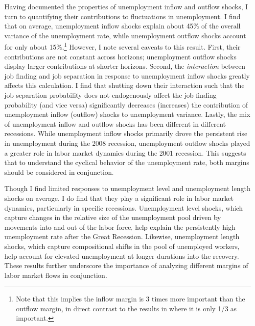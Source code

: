 \documentclass[12pt]{article}
\begin{document}
Having documented the properties of unemployment inflow and outflow shocks, I turn to quantifying their contributions to fluctuations in unemployment. I find that on average, unemployment inflow shocks explain about 45\% of the overall variance of the unemployment rate, while unemployment outflow shocks account for only about 15\%.\footnote{Note that this implies the inflow margin is 3 times more important than the outflow margin, in direct contrast to the results in \cite{Shimer:2012aa} where it is only 1/3 as important.} However, I note several caveats to this result. First, their contributions are not constant across horizons; unemployment outflow shocks display larger contributions at shorter horizons. Second, the \textit{interaction} between job finding and job separation in response to unemployment inflow shocks greatly affects this calculation. I find that shutting down their interaction such that the job separation probability does not endogenously affect the job finding probability (and vice versa) significantly decreases (increases) the contribution of unemployment inflow (outflow) shocks to unemployment variance. Lastly, the mix of unemployment inflow and outflow shocks has been different in different recessions. While unemployment inflow shocks primarily drove the persistent rise in unemployment during the 2008 recession, unemployment outflow shocks played a greater role in labor market dynamics during the 2001 recession. This suggests that to understand the cyclical behavior of the unemployment rate, both margins should be considered in conjunction.

Though I find limited responses to unemployment level and unemployment length shocks on average, I do find that they play a significant role in labor market dynamics, particularly in specific recessions. Unemployment level shocks, which capture changes in the relative size of the unemployment pool driven by movements into and out of the labor force, help explain the persistently high unemployment rate after the Great Recession. Likewise, unemployment length shocks, which capture compositional shifts in the pool of unemployed workers, help account for elevated unemployment at longer durations into the recovery. These results further underscore the importance of analyzing different margins of labor market flows in conjunction.
\end{document}
